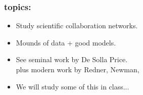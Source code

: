 


  \begin{frame}
    \frametitle{topics:}

    \begin{block}{}
    \begin{itemize}
    \item Study scientific collaboration networks.
    \item Mounds of data + good models.
    \item See seminal work by De Solla Price\cite{price1965a}.\\
      plus modern work by Redner, Newman, \etal
    \item We will study some of this in class...
    \end{itemize}
    \end{block}

  \end{frame}

